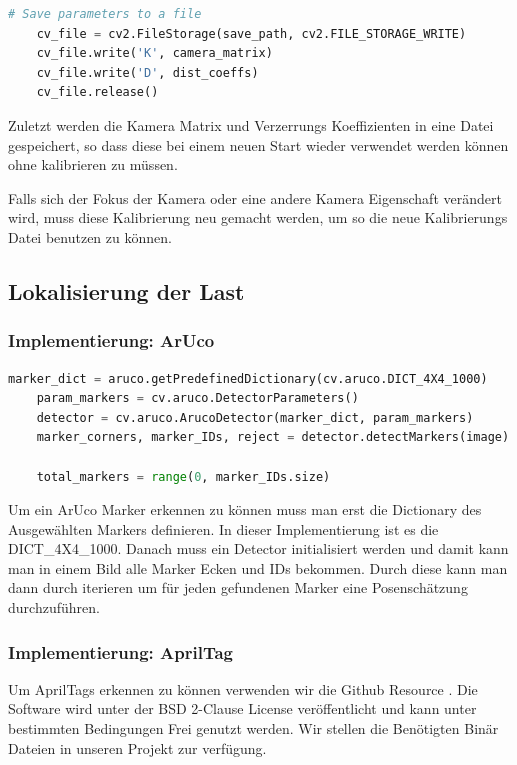 \begin{lstlisting}[language=Python, caption=Speicherung der Kalibrierungs-Daten in einer Datei]
    # Save parameters to a file
    cv_file = cv2.FileStorage(save_path, cv2.FILE_STORAGE_WRITE)
    cv_file.write('K', camera_matrix)
    cv_file.write('D', dist_coeffs)
    cv_file.release()
\end{lstlisting}

Zuletzt werden die Kamera Matrix und Verzerrungs Koeffizienten in eine Datei gespeichert, so dass diese bei einem neuen Start wieder verwendet werden können ohne kalibrieren zu müssen.

Falls sich der Fokus der Kamera oder eine andere Kamera Eigenschaft verändert wird, muss diese Kalibrierung neu gemacht werden, um so die neue Kalibrierungs Datei benutzen zu können.

\subsection{Lokalisierung der Last}

\subsubsection{Implementierung: ArUco}

\begin{lstlisting}[language=Python, caption=ID und Ecken eines ArUco Markers erkennen]
    marker_dict = aruco.getPredefinedDictionary(cv.aruco.DICT_4X4_1000)
    param_markers = cv.aruco.DetectorParameters()
    detector = cv.aruco.ArucoDetector(marker_dict, param_markers)
    marker_corners, marker_IDs, reject = detector.detectMarkers(image)
    
    total_markers = range(0, marker_IDs.size)
\end{lstlisting}

Um ein ArUco Marker erkennen zu können muss man erst die Dictionary des Ausgewählten Markers definieren. 
In dieser Implementierung ist es die DICT_4X4_1000.
Danach muss ein Detector initialisiert werden und damit kann man in einem Bild alle Marker Ecken und IDs bekommen.
Durch diese kann man dann durch iterieren um für jeden gefundenen Marker eine Posenschätzung durchzuführen.

\subsubsection{Implementierung: AprilTag}
Um AprilTags erkennen zu können verwenden wir die Github Resource \cite{apriltag_github}.
Die Software wird unter der BSD 2-Clause License veröffentlicht und kann unter bestimmten Bedingungen
Frei genutzt werden. Wir stellen die Benötigten Binär Dateien in unseren Projekt zur verfügung.

